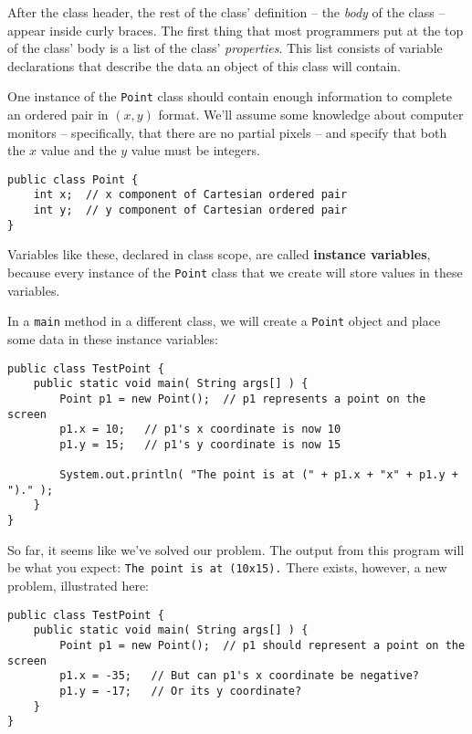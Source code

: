 After the class header, the rest of the class' definition -- the \textit{body} of the class -- appear inside curly braces.  The first thing that most programmers put at the top of the class' body is a list of the class' \textit{properties}.  This list consists of variable declarations that describe the data an object of this class will contain.

One instance of the \texttt{Point} class should contain enough information to complete an ordered pair in $(x,y)$ format.  We'll assume some knowledge about computer monitors -- specifically, that there are no partial pixels -- and specify that both the $x$ value and the $y$ value must be integers.

\begin{verbatim}
public class Point {
    int x;  // x component of Cartesian ordered pair
    int y;  // y component of Cartesian ordered pair
}
\end{verbatim}

Variables like these, declared in class scope, are called \textbf{instance variables}, because every instance of the \texttt{Point} class that we create will store values in these variables.

In a \texttt{main} method in a different class, we will create a \texttt{Point} object and place some data in these instance variables:

\begin{verbatim}
public class TestPoint {
    public static void main( String args[] ) {
        Point p1 = new Point();  // p1 represents a point on the screen
        p1.x = 10;   // p1's x coordinate is now 10
        p1.y = 15;   // p1's y coordinate is now 15

        System.out.println( "The point is at (" + p1.x + "x" + p1.y + ")." );
    }
}
\end{verbatim}

So far, it seems like we've solved our problem.  The output from this program will be what you expect: \texttt{The point is at (10x15).}  There exists, however, a new problem, illustrated here:

\begin{verbatim}
public class TestPoint {
    public static void main( String args[] ) {
        Point p1 = new Point();  // p1 should represent a point on the screen
        p1.x = -35;   // But can p1's x coordinate be negative?
        p1.y = -17;   // Or its y coordinate?
    }
}
\end{verbatim}


